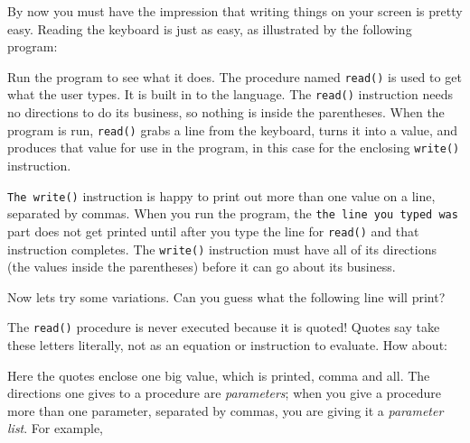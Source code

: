 By now you must have the impression that writing things on your screen
is pretty easy. Reading the keyboard is just as easy,
as illustrated by the following program:


Run the program to see what it does. The procedure named
\texttt{read()} is used to get what the user types. It is
built in to the language. The \texttt{read()} instruction needs no
directions to do its business, so nothing is inside the parentheses.
When the program is run, \texttt{read()} grabs a line from the
keyboard, turns it into a value, and produces that value for use in the
program, in this case for the enclosing \texttt{write()} instruction.

\texttt{The }\texttt{write()} instruction is happy to print out more
than one value on a line, separated by commas. When you run the
program, the \texttt{{\textquotedbl}the line you typed
was{\textquotedbl}} part does not get printed until after you type the
line for \texttt{read()} and that instruction completes. The
\texttt{write()} instruction must have all of its directions (the
values inside the parentheses) before it can go about its business.

Now let{\textquotesingle}s try some variations. Can you guess what the
following line will print?


The \texttt{read()} procedure is never executed because it is quoted!
Quotes say {\textquotedbl}take these letters literally, not
as an equation or instruction to evaluate.{\textquotedbl} How about:


\noindent Here the quotes enclose one big value, which is printed, comma
and all. The directions one gives to a procedure are
\textit{parameters}; when you give a procedure more than one parameter,
separated by commas, you are giving it a
\textit{parameter list}. For example,


